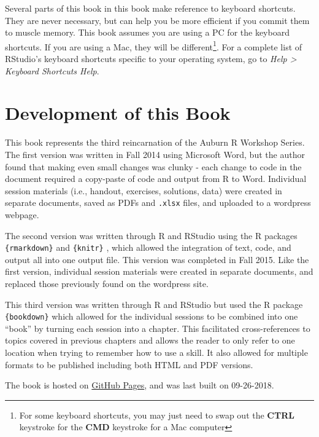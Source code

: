 \documentclass[]{book}
\let\rmarkdownfootnote\footnote%
\def\footnote{\protect\rmarkdownfootnote}
\theoremstyle{definition}
\theoremstyle{definition}
\theoremstyle{definition}
\theoremstyle{remark}
\begin{document}
Several parts of this book in this book make reference to keyboard
shortcuts. They are never necessary, but can help you be more efficient
if you commit them to muscle memory. This book assumes you are using a
PC for the keyboard shortcuts. If you are using a Mac, they will be
different\footnote{For some keyboard shortcuts, you may just need to
  swap out the \textbf{CTRL} keystroke for the \textbf{CMD} keystroke
  for a Mac computer}. For a complete list of RStudio's keyboard
shortcuts specific to your operating system, go to \emph{Help
\textgreater{} Keyboard Shortcuts Help}.

\section*{Development of this Book}\label{development-of-this-book}

This book represents the third reincarnation of the Auburn R Workshop
Series. The first version was written in Fall 2014 using Microsoft Word,
but the author found that making even small changes was clunky - each
change to code in the document required a copy-paste of code and output
from R to Word. Individual session materials (i.e., handout, exercises,
solutions, data) were created in separate documents, saved as PDFs and
\texttt{.xlsx} files, and uploaded to a wordpress webpage.

The second version was written through R and RStudio using the R
packages \texttt{\{rmarkdown\}} \citep{rmarkdown-cite} and
\texttt{\{knitr\}} \citep{knitr-cite}, which allowed the integration of
text, code, and output all into one output file. This version was
completed in Fall 2015. Like the first version, individual session
materials were created in separate documents, and replaced those
previously found on the wordpress site.

This third version was written through R and RStudio but used the R
package \texttt{\{bookdown\}} \citep{bookdown-cite} which allowed for
the individual sessions to be combined into one ``book'' by turning each
session into a chapter. This facilitated cross-references to topics
covered in previous chapters and allows the reader to only refer to one
location when trying to remember how to use a skill. It also allowed for
multiple formats to be published including both HTML and PDF versions.

The book is hosted on \href{https://pages.github.com/}{GitHub Pages},
and was last built on 09-26-2018.
\end{document}
